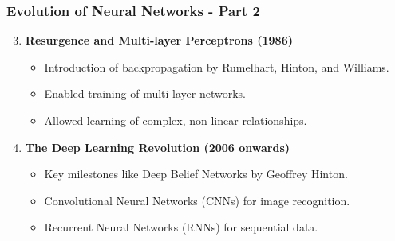 \documentclass[aspectratio=169]{beamer}
\begin{document}
\begin{frame}[fragile]
    \frametitle{Evolution of Neural Networks - Part 2}
    \begin{enumerate}
        \setcounter{enumi}{2} %
        \item \textbf{Resurgence and Multi-layer Perceptrons (1986)}
        \begin{itemize}
            \item Introduction of backpropagation by Rumelhart, Hinton, and Williams.
            \item Enabled training of multi-layer networks.
            \item Allowed learning of complex, non-linear relationships.
        \end{itemize}
        
        \item \textbf{The Deep Learning Revolution (2006 onwards)}
        \begin{itemize}
            \item Key milestones like Deep Belief Networks by Geoffrey Hinton.
            \item Convolutional Neural Networks (CNNs) for image recognition.
            \item Recurrent Neural Networks (RNNs) for sequential data.
        \end{itemize}
    \end{enumerate}
\end{frame}
\end{document}
